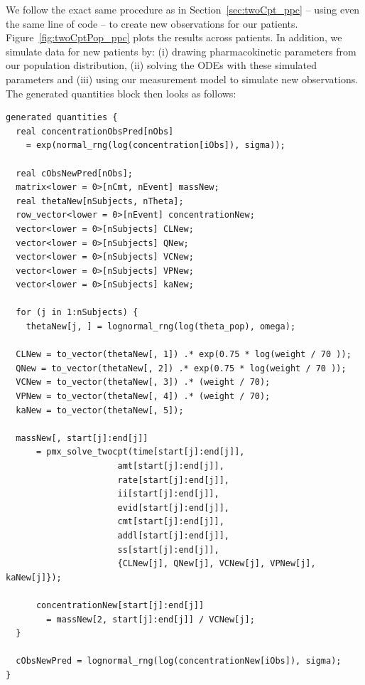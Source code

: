 We follow the exact same procedure as in Section~\ref{sec:twoCpt_ppc} -- using even the same line of code -- to create new observations for our patients.
Figure~\ref{fig:twoCptPop_ppc} plots the results across patients.
In addition, we simulate data for new patients by: (i) drawing pharmacokinetic parameters from our population distribution, (ii) solving the ODEs with these simulated parameters and (iii) using our measurement model to simulate new observations.
The generated quantities block then looks as follows:
%
\begin{lstlisting}[style=stan, numbers=none]
generated quantities {
  real concentrationObsPred[nObs] 
    = exp(normal_rng(log(concentration[iObs]), sigma));

  real cObsNewPred[nObs];
  matrix<lower = 0>[nCmt, nEvent] massNew;
  real thetaNew[nSubjects, nTheta];
  row_vector<lower = 0>[nEvent] concentrationNew;
  vector<lower = 0>[nSubjects] CLNew;
  vector<lower = 0>[nSubjects] QNew;
  vector<lower = 0>[nSubjects] VCNew;
  vector<lower = 0>[nSubjects] VPNew;
  vector<lower = 0>[nSubjects] kaNew;

  for (j in 1:nSubjects) {
    thetaNew[j, ] = lognormal_rng(log(theta_pop), omega);

  CLNew = to_vector(thetaNew[, 1]) .* exp(0.75 * log(weight / 70 ));
  QNew = to_vector(thetaNew[, 2]) .* exp(0.75 * log(weight / 70 ));
  VCNew = to_vector(thetaNew[, 3]) .* (weight / 70);
  VPNew = to_vector(thetaNew[, 4]) .* (weight / 70);
  kaNew = to_vector(thetaNew[, 5]);

  massNew[, start[j]:end[j]]
      = pmx_solve_twocpt(time[start[j]:end[j]],
                      amt[start[j]:end[j]],
                      rate[start[j]:end[j]],
                      ii[start[j]:end[j]],
                      evid[start[j]:end[j]],
                      cmt[start[j]:end[j]],
                      addl[start[j]:end[j]],
                      ss[start[j]:end[j]],
                      {CLNew[j], QNew[j], VCNew[j], VPNew[j], kaNew[j]});

      concentrationNew[start[j]:end[j]]
        = massNew[2, start[j]:end[j]] / VCNew[j];
  }

  cObsNewPred = lognormal_rng(log(concentrationNew[iObs]), sigma);
}
\end{lstlisting}

